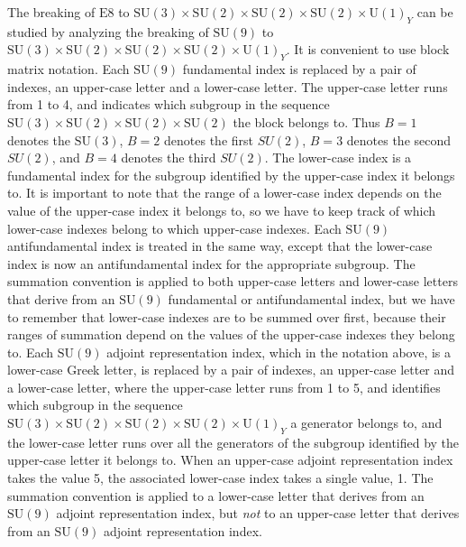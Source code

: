 \documentclass[a4paper,12pt,oneside]{article}
\begin{document}
The breaking of $\mathrm{E}8$ to $\mathrm{SU}(3)\times\mathrm{SU}(2)
\times\mathrm{SU}(2)\times\mathrm{SU}(2)\times\mathrm{U}(1)_Y$ can 
be studied by analyzing the breaking of
$\mathrm{SU}(9)$ to $\mathrm{SU}(3)\times\mathrm{SU}(2)
\times\mathrm{SU}(2)\times\mathrm{SU}(2)\times\mathrm{U}(1)_Y$.  It 
is convenient to use block matrix notation.
Each $\mathrm{SU}(9)$ fundamental index is replaced by a pair of
indexes, an upper-case letter and a lower-case letter.  The 
upper-case letter runs from 1 to 4, and indicates which subgroup in
the sequence $\mathrm{SU}(3)\times\mathrm{SU}(2)
\times\mathrm{SU}(2)\times\mathrm{SU}(2)$ the block belongs to.  
Thus $B=1$ denotes the $\mathrm{SU}(3)$, $B=2$ denotes the first
$SU(2)$, $B=3$ denotes the second $SU(2)$, and $B=4$ denotes the
third $SU(2)$.  The lower-case index is a fundamental index for the
subgroup identified by the upper-case index it belongs to.  It is
important to note that the range of a lower-case index depends on 
the value of the upper-case index it belongs to, so we have to keep
track of which lower-case indexes belong to which upper-case 
indexes.  Each $\mathrm{SU}(9)$ antifundamental index is treated in 
the
same way, except that the lower-case index is now an antifundamental
index for the appropriate subgroup.  The summation convention is
applied to both upper-case letters and lower-case letters that 
derive from an $\mathrm{SU}(9)$ fundamental or antifundamental 
index, but we have to remember that lower-case indexes are to be 
summed over first, because their ranges of summation depend on the
values of the upper-case indexes they belong to.  Each 
$\mathrm{SU}(9)$ adjoint representation index, which in the notation
above, is a lower-case Greek letter, is replaced by a pair of 
indexes, an
upper-case letter and a lower-case letter, where the upper-case 
letter runs from 1 to 5, and identifies which subgroup in the 
sequence $\mathrm{SU}(3)\times\mathrm{SU}(2)
\times\mathrm{SU}(2)\times\mathrm{SU}(2)\times\mathrm{U}(1)_Y$ a 
generator belongs to, and the lower-case 
letter runs over all the
generators of the subgroup identified by the upper-case letter it
belongs to.  When an upper-case adjoint representation index takes 
the value 5, the associated lower-case index takes a single
value, 1.  The summation convention is applied to a lower-case
letter that derives from an $\mathrm{SU}(9)$ adjoint representation
index, but \emph{not} to an upper-case letter that derives from an
$\mathrm{SU}(9)$ adjoint representation index.
\end{document}
